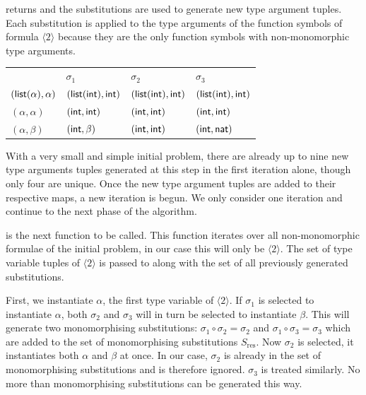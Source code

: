 \documentclass[runningheads]{llncs}
\begin{document}
\begin{examplex}
\SubstGen returns and the substitutions are used to generate new type argument tuples. Each substitution is applied to the type arguments of the function symbols of formula \(\langle2\rangle\) because they are the only function symbols with non-monomorphic type arguments.
\begin{table}
\centering\begin{tabular}{@{}l*{3}{>{\centering\arraybackslash}p{6em}}@{}}
   \toprule
   & \(\sigma_1\) &\(\sigma_2\)&\(\sigma_3\)\\
   \cmidrule(lr){2-2} \cmidrule(lr){3-3} \cmidrule(l){4-4} 
   \((\textsf{list}(\alpha), \alpha)\)&\((\textsf{list}(\textsf{int}), \textsf{int})\)& \((\textsf{list}(\textsf{int}), \textsf{int})\) & \((\textsf{list}(\textsf{int}), \textsf{int})\) \\
   \((\alpha, \alpha)\) &\((\textsf{int}, \textsf{int})\)&\((\textsf{int}, \textsf{int})\) &\((\textsf{int}, \textsf{int})\)\\
   \((\alpha, \beta)\)  &\((\textsf{int}, \beta)\)&\((\textsf{int}, \textsf{int})\) &\((\textsf{int}, \textsf{nat})\)\\
    \bottomrule
\end{tabular}
\end{table}
\vspace{-0.5em}

With a very small and simple initial problem, there are already up to nine new type arguments tuples generated at this step in the first iteration alone, though only four are unique. Once the new type argument tuples are added to their respective maps, a new iteration is begun. We only consider one iteration and continue to the next phase of the algorithm.

\GenFormulae is the next function to be called. This function iterates over all non-monomorphic formulae of the initial problem, in our case this will only be \(\langle2\rangle\). The set of type variable tuples of \(\langle2\rangle\) is passed to \MonoSubst along with the set of all previously generated substitutions.

First, we instantiate \(\alpha\), the first type variable of \(\langle2\rangle\). If \(\sigma_1\) is selected to instantiate \(\alpha\), both \(\sigma_2\) and \(\sigma_3\) will in turn be selected to instantiate \(\beta\). This will generate two monomorphising substitutions: \(\sigma_1 \circ \sigma_2 = \sigma_2\) and \(\sigma_1 \circ \sigma_3 = \sigma_3\) which are added to the set of monomorphising substitutions \(S_{\text{res}}\). Now \(\sigma_2\) is selected, it instantiates both \(\alpha\) and \(\beta\) at once. In our case, \(\sigma_2\) is already in the set of monomorphising substitutions and is therefore ignored. \(\sigma_3\) is treated similarly. No more than \SubstLimit monomorphising substitutions can be generated this way.


\end{examplex}
\end{document}
